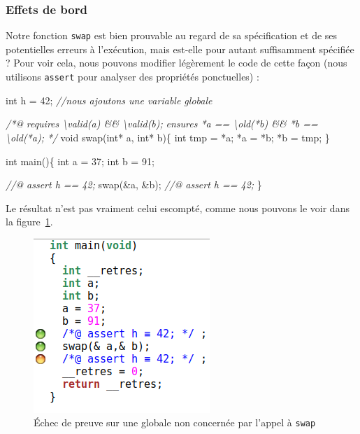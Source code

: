 \documentclass[12pt,francais,]{scrbook}
\newenvironment{Shaded}{}{}
\newcommand{\DataTypeTok}[1]{\textcolor[rgb]{0.56,0.13,0.00}{{#1}}}
\newcommand{\DecValTok}[1]{\textcolor[rgb]{0.25,0.63,0.44}{{#1}}}
\newcommand{\CommentTok}[1]{\textcolor[rgb]{0.38,0.63,0.69}{\textit{{#1}}}}
\newcommand{\NormalTok}[1]{{#1}}
\begin{document}
\subsubsection{Effets de bord}\label{effets-de-bord}

Notre fonction \texttt{swap} est bien prouvable au regard de sa
spécification et de ses potentielles erreurs à l'exécution, mais
est-elle pour autant suffisamment spécifiée ? Pour voir cela, nous
pouvons modifier légèrement le code de cette façon (nous utilisons
\texttt{assert} pour analyser des propriétés ponctuelles) :

\begin{footnotesize}\begin{Shaded}
\begin{Highlighting}[]
\DataTypeTok{int} \NormalTok{h = }\DecValTok{42}\NormalTok{; }\CommentTok{//nous ajoutons une variable globale}

\CommentTok{/*@}
\CommentTok{  requires \textbackslash{}valid(a) && \textbackslash{}valid(b);}
\CommentTok{  ensures  *a == \textbackslash{}old(*b) && *b == \textbackslash{}old(*a);}
\CommentTok{*/}
\DataTypeTok{void} \NormalTok{swap(}\DataTypeTok{int}\NormalTok{* a, }\DataTypeTok{int}\NormalTok{* b)\{}
  \DataTypeTok{int} \NormalTok{tmp = *a;}
  \NormalTok{*a = *b;}
  \NormalTok{*b = tmp;}
\NormalTok{\}}

\DataTypeTok{int} \NormalTok{main()\{}
  \DataTypeTok{int} \NormalTok{a = }\DecValTok{37}\NormalTok{;}
  \DataTypeTok{int} \NormalTok{b = }\DecValTok{91}\NormalTok{;}

  \CommentTok{//@ assert h == 42;}
  \NormalTok{swap(&a, &b);}
  \CommentTok{//@ assert h == 42;}
\NormalTok{\}}
\end{Highlighting}
\end{Shaded}\end{footnotesize}

Le résultat n'est pas vraiment celui escompté, comme nous pouvons le
voir dans la figure~\ref{fig:2-2-2-swap-1}.

\begin{figure}[htbp]
\centering
\includegraphics[scale=0.5]{2-2-2-swap-1.png}
\caption{Échec de preuve sur une globale non concernée par l'appel à
\texttt{swap}}
\label{fig:2-2-2-swap-1}
\end{figure}
\end{document}
